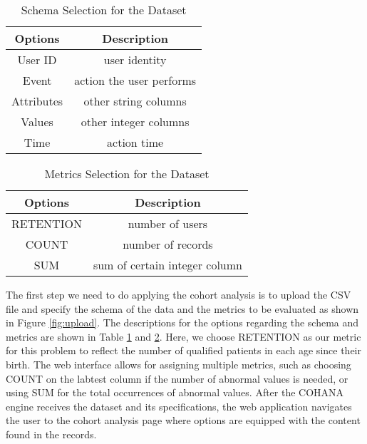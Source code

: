 \begin{table}[tb!]
\begin{center}
    \begin{tabular}{ |c|c| }
        \hline
        Options & Description \\[0.5ex] 
        \hline\hline
        User ID & user identity \\
        \hline
        Event & action the user performs\\
        \hline
        Attributes & other string columns\\
        \hline
        Values & other integer columns\\
        \hline
        Time & action time \\
        \hline
    \end{tabular}
\end{center}
\caption{Schema Selection for the Dataset}
\label{table:schema}
\end{table}

\begin{table}[tb!]
\begin{center}
    \begin{tabular}{ | c | c | }
        \hline
        Options & Description \\[0.5ex] 
        \hline\hline
        RETENTION & number of users \\
        \hline
        COUNT & number of records \\
        \hline
        SUM & sum of certain integer column \\
        \hline
    \end{tabular}
\end{center}
\caption{Metrics Selection for the Dataset}
\label{table:metrics}
\end{table}

The first step we need to do applying the cohort analysis is to upload the CSV file and specify the schema of the data and the metrics to be evaluated as shown in Figure \ref{fig:upload}. 
The descriptions for the options regarding the schema and metrics are shown in Table \ref{table:schema} and \ref{table:metrics}. 
Here, we choose RETENTION as our metric for this problem to reflect the number of qualified patients in each age since their birth. 
The web interface allows for assigning multiple metrics, such as choosing COUNT on the labtest column if the number of abnormal values is needed, or using SUM for the total occurrences of abnormal values. 
After the COHANA engine receives the dataset and its specifications, the web application navigates the user to the cohort analysis page where options are equipped with the content found in the records.

